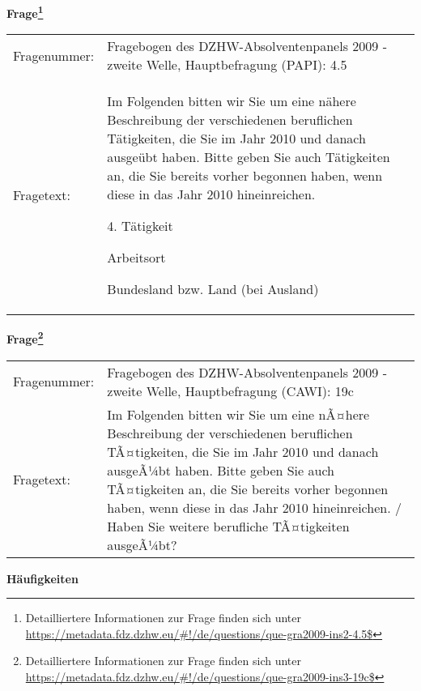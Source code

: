 				\vspace*{0.5cm}
                \noindent\textbf{Frage\footnote{Detailliertere Informationen zur Frage finden sich unter
		              \url{https://metadata.fdz.dzhw.eu/\#!/de/questions/que-gra2009-ins2-4.5$}}}\\
				\begin{tabularx}{\hsize}{@{}lX}
					Fragenummer: &
					  Fragebogen des DZHW-Absolventenpanels 2009 - zweite Welle, Hauptbefragung (PAPI):
					  4.5
 \\
					Fragetext: & Im Folgenden bitten wir Sie um eine nähere Beschreibung der verschiedenen beruflichen Tätigkeiten, die Sie im Jahr 2010 und danach ausgeübt haben. Bitte geben Sie auch Tätigkeiten an, die Sie bereits vorher begonnen haben, wenn diese in das Jahr 2010 hineinreichen.\par  4. Tätigkeit\par  Arbeitsort\par  Bundesland bzw. Land (bei Ausland) \\
				\end{tabularx}
				\vspace*{0.5cm}
                \noindent\textbf{Frage\footnote{Detailliertere Informationen zur Frage finden sich unter
		              \url{https://metadata.fdz.dzhw.eu/\#!/de/questions/que-gra2009-ins3-19c$}}}\\
				\begin{tabularx}{\hsize}{@{}lX}
					Fragenummer: &
					  Fragebogen des DZHW-Absolventenpanels 2009 - zweite Welle, Hauptbefragung (CAWI):
					  19c
 \\
					Fragetext: & Im Folgenden bitten wir Sie um eine nÃ¤here Beschreibung der verschiedenen beruflichen TÃ¤tigkeiten, die Sie im Jahr 2010 und danach ausgeÃ¼bt haben. Bitte geben Sie auch TÃ¤tigkeiten an, die Sie bereits vorher begonnen haben, wenn diese in das Jahr 2010 hineinreichen. / Haben Sie weitere berufliche TÃ¤tigkeiten ausgeÃ¼bt? \\
				\end{tabularx}





        		\vspace*{0.5cm}
                \noindent\textbf{Häufigkeiten}

